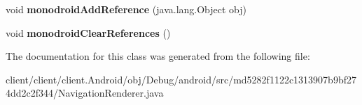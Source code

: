 \begin{DoxyCompactItemize}
\item 
\hypertarget{classmd5282f1122c1313907b9bf274dd2c2f344_1_1NavigationRenderer_ab19c3df8f3e7002ecb19c7739cd3b7ac}{}void {\bfseries monodroid\+Add\+Reference} (java.\+lang.\+Object obj)\label{classmd5282f1122c1313907b9bf274dd2c2f344_1_1NavigationRenderer_ab19c3df8f3e7002ecb19c7739cd3b7ac}

\item 
\hypertarget{classmd5282f1122c1313907b9bf274dd2c2f344_1_1NavigationRenderer_a0fd2a0f2eeeb0faf06604589ba005ff5}{}void {\bfseries monodroid\+Clear\+References} ()\label{classmd5282f1122c1313907b9bf274dd2c2f344_1_1NavigationRenderer_a0fd2a0f2eeeb0faf06604589ba005ff5}

\end{DoxyCompactItemize}


The documentation for this class was generated from the following file\+:\begin{DoxyCompactItemize}
\item 
client/client/client.\+Android/obj/\+Debug/android/src/md5282f1122c1313907b9bf274dd2c2f344/Navigation\+Renderer.\+java\end{DoxyCompactItemize}
